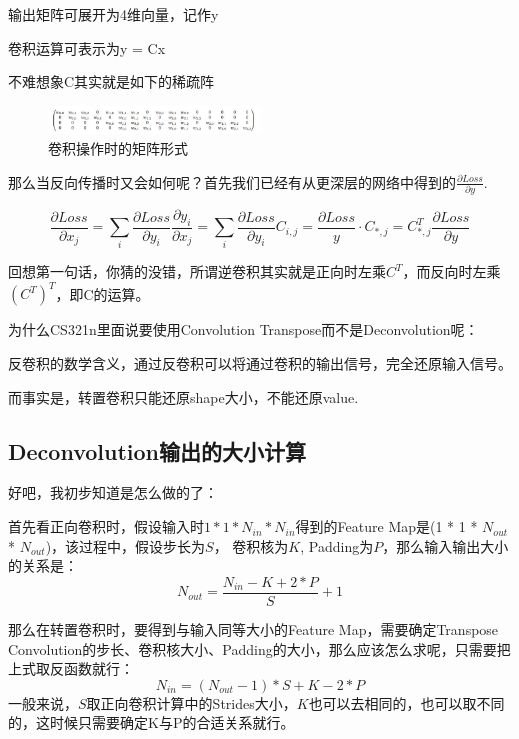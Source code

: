 输出矩阵可展开为4维向量，记作y

卷积运算可表示为y = Cx

不难想象C其实就是如下的稀疏阵
\begin{figure}[!htbp]
\centering
\includegraphics[width=0.5\textwidth]{DLTips/Deconvolution2.jpg}
\caption{卷积操作时的矩阵形式}
\label{Deconvolution2}
\end{figure}

那么当反向传播时又会如何呢？首先我们已经有从更深层的网络中得到的$\frac{\partial Loss}{\partial y}$.

\begin{displaymath}
\frac{\partial{Loss}}{\partial{x_j}} = \sum_{i}\frac{\partial{Loss}}{\partial y_i} \frac{\partial y_i}{\partial{x_j}} = \sum_{i} \frac{\partial{Loss}}{\partial y_i} C_{i, j} = \frac{\partial{Loss}}{y} \cdot C_{*, j} = C_{*, j}^T \frac{\partial{Loss}}{\partial y}
\end{displaymath}

回想第一句话，你猜的没错，所谓逆卷积其实就是正向时左乘$C^T$，而反向时左乘$(C^T)^T$，即C的运算。

为什么CS321n里面说要使用Convolution Transpose而不是Deconvolution呢：

反卷积的数学含义，通过反卷积可以将通过卷积的输出信号，完全还原输入信号。

而事实是，转置卷积只能还原shape大小，不能还原value.

\subsection{Deconvolution输出的大小计算}

好吧，我初步知道是怎么做的了：

首先看正向卷积时，假设输入时$1 * 1 * N_{in} * N_{in}$得到的Feature Map是(1 * 1 * $N_{out}$ * $N_{out}$)，该过程中，假设步长为$S$， 卷积核为$K$, Padding为$P$，那么输入输出大小的关系是：
\begin{displaymath}
N_{out} = \frac{N_{in} - K + 2 * P}{S} + 1
\end{displaymath}

那么在转置卷积时，要得到与输入同等大小的Feature Map，需要确定Transpose Convolution的步长、卷积核大小、Padding的大小，那么应该怎么求呢，只需要把上式取反函数就行：
\begin{displaymath}
N_{in} = (N_{out} - 1) * S + K - 2 * P
\end{displaymath}
一般来说，$S$取正向卷积计算中的Strides大小，$K$也可以去相同的，也可以取不同的，这时候只需要确定K与P的合适关系就行。

